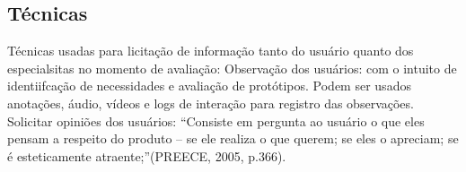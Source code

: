\subsection{Técnicas} 

	Técnicas usadas para licitação de informação tanto do usuário quanto dos especialsitas no momento de avaliação:
Observação dos usuários: com o intuito de identiifcação de necessidades e avaliação de protótipos. Podem ser usados anotações, áudio, vídeos e logs de interação para registro das observações. 
Solicitar opiniões dos usuários: “Consiste em pergunta ao usuário o que eles pensam a respeito do produto – se ele realiza o que querem; se eles o apreciam; se é esteticamente atraente;”(PREECE, 2005, p.366). 
